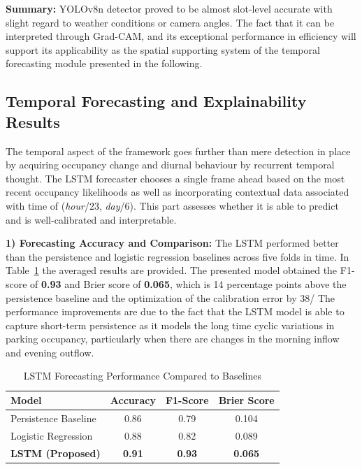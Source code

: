 \documentclass[conference]{IEEEtran}
\begin{document}
\vspace{0.3em}
\noindent\textbf{Summary:}
YOLOv8n detector proved to be almost slot-level accurate with slight regard to weather conditions or camera angles. The fact that it can be interpreted through Grad-CAM, and its exceptional performance in efficiency will support its applicability as the spatial supporting system of the temporal forecasting module presented in the following.

\subsection{Temporal Forecasting and Explainability Results}
The temporal aspect of the framework goes further than mere detection in place by acquiring occupancy change and diurnal behaviour by recurrent temporal thought. The LSTM forecaster chooses a single frame ahead based on the most recent occupancy likelihoods as well as incorporating contextual data associated with time of (\textit{hour}/23, \textit{day}/6). This part assesses whether it is able to predict and is well-calibrated and interpretable.

\vspace{0.3em}
\noindent\textbf{1) Forecasting Accuracy and Comparison:}
The LSTM performed better than the persistence and logistic regression baselines across five folds in time. In Table~\ref{tab:lstm_metrics} the averaged results are provided. The presented model obtained the F1-score of \textbf{0.93} and Brier score of \textbf{0.065}, which is 14 percentage points above the persistence baseline and the optimization of the calibration error by 38/%
The performance improvements are due to the fact that the LSTM model is able to capture short-term persistence as it models the long time cyclic variations in parking occupancy, particularly when there are changes in the morning inflow and evening outflow.

\begin{table}[htbp]
\caption{LSTM Forecasting Performance Compared to Baselines}
\begin{center}
\begin{tabular}{|l|c|c|c|}
\hline
\textbf{Model} & \textbf{Accuracy} & \textbf{F1-Score} & \textbf{Brier Score} \\
\hline
Persistence Baseline & 0.86 & 0.79 & 0.104 \\
Logistic Regression & 0.88 & 0.82 & 0.089 \\
\textbf{LSTM (Proposed)} & \textbf{0.91} & \textbf{0.93} & \textbf{0.065} \\
\hline
\end{tabular}
\label{tab:lstm_metrics}
\end{center}
\end{table}
\end{document}
